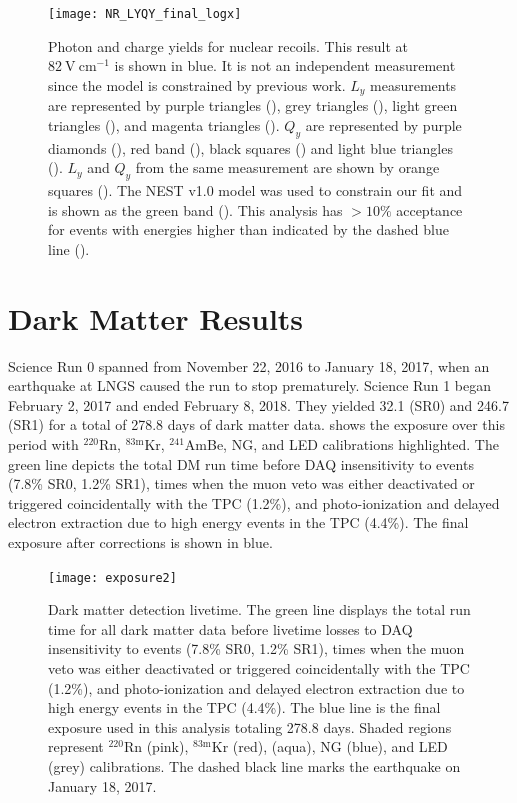 \begin{figure}
\centering
\texttt{[image: NR\_LYQY\_final\_logx]}
\caption{Photon and charge yields for nuclear recoils.  This result at $82\ \mathrm{V\ cm^{-1}}$ is shown in blue.  It is not
an independent measurement since the model is constrained by previous work.  $L_y$ measurements are represented by purple triangles
(), grey triangles (), light green triangles (), and magenta triangles
().  $Q_y$ are represented by purple diamonds (), red band (), black squares
() and light blue triangles ().  $L_y$ and $Q_y$ from the same measurement are shown by orange
squares
().  The NEST v1.0 model was used to constrain our fit and is shown as the green band ().  This
analysis has $> 10\%$ acceptance for events with energies higher than indicated by the dashed blue line
().}
\label{fig:er_nr_calibrations_results_ly_qy_nr}
\end{figure}



\section{Dark Matter Results}
\label{sec:dark_matter_results}
Science Run 0 spanned from November 22, 2016 to January 18, 2017, when an earthquake at LNGS caused the run to stop prematurely.  Science
Run 1 began February 2, 2017 and ended February 8, 2018.  They
yielded 32.1 (SR0) and 246.7 (SR1) for a total of 278.8 days of dark matter data.   shows the
exposure over this period with $^{220}$Rn, $^{83\mathrm{m}}$Kr, $^{241}$AmBe, NG, and LED calibrations highlighted.  The green line
depicts the total DM run time before DAQ insensitivity to events (7.8\% SR0, 1.2\% SR1), times when the muon veto was either
deactivated or triggered coincidentally with the TPC (1.2\%), and photo-ionization and delayed electron extraction due to high energy
events in the TPC (4.4\%).  The final exposure after corrections is shown in blue.

\begin{figure}
\centering
\texttt{[image: exposure2]}
\caption{Dark matter detection livetime.  The green line displays the total run time for all dark matter data before
livetime losses to DAQ insensitivity to events (7.8\% SR0, 1.2\% SR1), times when the muon veto was either
deactivated or triggered coincidentally with the TPC (1.2\%), and photo-ionization and delayed electron extraction due to high energy
events in the TPC (4.4\%).  The blue line is the final exposure used in this analysis totaling 278.8 days.  Shaded regions represent
$^{220}$Rn (pink), $^{83\mathrm{m}}$Kr (red), \ambe (aqua), NG (blue), and LED (grey) calibrations.  The dashed black line marks the
earthquake on January 18, 2017.}
\label{fig:dark_matter_results_exposure}
\end{figure}



